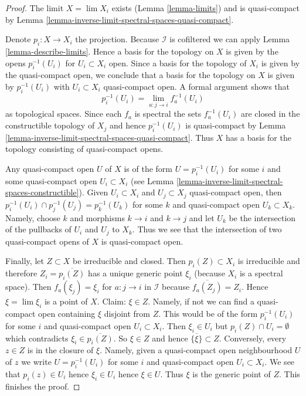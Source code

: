 \begin{proof}
The limit $X = \lim X_i$ exists (Lemma \ref{lemma-limits})
and is quasi-compact by
Lemma \ref{lemma-inverse-limit-spectral-spaces-quasi-compact}.

\medskip\noindent
Denote $p_i : X \to X_i$ the projection.
Because $\mathcal{I}$ is cofiltered we can apply
Lemma \ref{lemma-describe-limits}.
Hence a basis for the topology on $X$ is given by the opens
$p_i^{-1}(U_i)$ for $U_i \subset X_i$ open. Since a basis for
the topology of $X_i$ is given by the quasi-compact open, we conclude
that a basis for the topology on $X$ is given by $p_i^{-1}(U_i)$
with $U_i \subset X_i$ quasi-compact open. A formal argument
shows that
$$
p_i^{-1}(U_i) = \lim_{a : j \to i} f_a^{-1}(U_i)
$$
as topological spaces. Since each $f_a$ is spectral the sets
$f_a^{-1}(U_i)$ are closed in the constructible topology of $X_j$
and hence $p_i^{-1}(U_i)$ is quasi-compact
by Lemma \ref{lemma-inverse-limit-spectral-spaces-quasi-compact}.
Thus $X$ has a basis for the topology consisting of quasi-compact opens.

\medskip\noindent
Any quasi-compact open $U$ of $X$ is of the form $U = p_i^{-1}(U_i)$
for some $i$ and some quasi-compact open $U_i \subset X_i$
(see Lemma \ref{lemma-inverse-limit-spectral-spaces-constructible}).
Given $U_i \subset X_i$ and $U_j \subset X_j$ quasi-compact open, then
$p_i^{-1}(U_i) \cap p_j^{-1}(U_j) = p_k^{-1}(U_k)$ for some $k$
and quasi-compact open $U_k \subset X_k$. Namely, choose $k$
and morphisms $k \to i$ and $k \to j$ and let $U_k$ be the intersection of the
pullbacks of $U_i$ and $U_j$ to $X_k$. Thus we see that the intersection
of two quasi-compact opens of $X$ is quasi-compact open.

\medskip\noindent
Finally, let $Z \subset X$ be irreducible and closed. Then $p_i(Z) \subset X_i$
is irreducible and therefore $Z_i = \overline{p_i(Z)}$ has a unique generic
point $\xi_i$ (because $X_i$ is a spectral space). Then $f_a(\xi_j) = \xi_i$
for $a : j \to i$ in $\mathcal{I}$ because $\overline{f_a(Z_j)} = Z_i$.
Hence $\xi = \lim \xi_i$ is a point of $X$. Claim: $\xi \in Z$. Namely,
if not we can find a quasi-compact open containing $\xi$ disjoint
from $Z$. This would be of the form $p_i^{-1}(U_i)$ for some $i$ and
quasi-compact open $U_i \subset X_i$. Then $\xi_i \in U_i$ but
$p_i(Z) \cap U_i = \emptyset$ which contradicts $\xi_i \in \overline{p_i(Z)}$.
So $\xi \in Z$ and hence $\overline{\{\xi\}} \subset Z$. Conversely,
every $z \in Z$ is in the closure of $\xi$. Namely, given a quasi-compact
open neighbourhood $U$ of $z$ we write $U = p_i^{-1}(U_i)$ for some $i$
and quasi-compact open $U_i \subset X_i$. We see that $p_i(z) \in U_i$
hence $\xi_i \in U_i$ hence $\xi \in U$. Thus $\xi$ is the generic point
of $Z$. This finishes the proof.
\end{proof}


